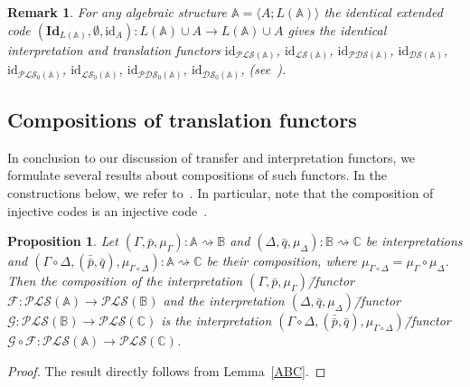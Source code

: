 \documentclass[12pt]{article}
\newtheorem{proposition}{Proposition}
\newtheorem{remark}{Remark}
\theoremstyle{definition}
\def\MA{{\mathbb{A}}}
\def\MB{{\mathbb{B}}}
\def\MC{{\mathbb{C}}}
\def\F{{\mathcal{F}}}
\def\G{{\mathcal{G}}}
\def\PLS{{\mathcal{PLS}}}
\def\PDS{{\mathcal{PDS}}}
\def\DS{{\mathcal{DS}}}
\def\LS{{\mathcal{LS}}}
\def\id{{\mathrm{id}}}
\def\Id{{\mathbf{Id}}}
\begin{document}
\begin{remark}\label{remark:ID}
For any algebraic structure $\MA=\langle A; L(\MA)\rangle$ the identical extended code $(\Id_{L(\MA)},\emptyset,\id_A)\colon L(\MA)\cup A\to L(\MA)\cup A$ gives the identical interpretation and translation functors $\id_{\PLS(\MA)}$, $\id_{\LS(\MA)}$, $\id_{\PDS(\MA)}$, $\id_{\DS(\MA)}$, $\id_{\PLS_0(\MA)}$, $\id_{\LS_0(\MA)}$, $\id_{\PDS_0(\MA)}$, $\id_{\DS_0(\MA)}$, (see~\cite[Remark~11]{Th_int1}).
\end{remark}

\subsection{Compositions of translation functors}\label{subsec:ABC}

In conclusion to our discussion of transfer and interpretation functors, we formulate several results about compositions of such functors. In the constructions below, we refer to~\cite[Subsection~4.1]{Th_int1}. In particular, note that the composition of injective codes is an injective code~\cite[Lemma~9~(3)]{Th_int1}.

\begin{proposition}\label{th:ABC}
Let $(\Gamma,\bar p, \mu_\Gamma)\colon\MA\rightsquigarrow\MB$ and $(\Delta,\bar q, \mu_\Delta)\colon\MB\rightsquigarrow\MC$ be interpretations and $(\Gamma\circ\Delta,(\bar{\bar p},\bar q),\mu_{\Gamma\circ\Delta})\colon\MA\rightsquigarrow\MC$ be their composition, where $\mu_{\Gamma\circ\Delta}=\mu_\Gamma\circ\mu_\Delta$. Then the composition of the interpretation $(\Gamma,\bar p,\mu_\Gamma)$\=/functor  $\F\colon\PLS(\MA)\to\PLS(\MB)$ and the interpretation $(\Delta,\bar q,\mu_\Delta)$\=/functor  $\G\colon\PLS(\MB)\to\PLS(\MC)$ is the interpretation $(\Gamma\circ\Delta,(\bar{\bar p},\bar q),\mu_{\Gamma\circ\Delta})$\=/functor  $\G\circ\F\colon\PLS(\MA)\to\PLS(\MC)$. 
\end{proposition}

\begin{proof}
The result directly follows from Lemma~\ref{ABC}.  
\end{proof}
\end{document}
